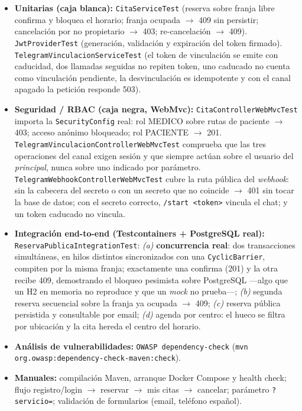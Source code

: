 \documentclass[12pt,a4paper]{report}
\begin{document}
\begin{itemize}
  \item \textbf{Unitarias (caja blanca):} \texttt{CitaServiceTest} (reserva sobre franja libre confirma y bloquea el horario; franja ocupada $\rightarrow$ 409 sin persistir; cancelación por no propietario $\rightarrow$ 403; re-cancelación $\rightarrow$ 409). \texttt{JwtProviderTest} (generación, validación y expiración del token firmado). \texttt{TelegramVinculacionServiceTest} (el token de vinculación se emite con caducidad, dos llamadas seguidas no repiten token, uno caducado no cuenta como vinculación pendiente, la desvinculación es idempotente y con el canal apagado la petición responde 503).
  \item \textbf{Seguridad / RBAC (caja negra, WebMvc):} \texttt{CitaControllerWebMvcTest} importa la \texttt{SecurityConfig} real: rol MEDICO sobre rutas de paciente $\rightarrow$ 403; acceso anónimo bloqueado; rol PACIENTE $\rightarrow$ 201. \texttt{TelegramVinculacionControllerWebMvcTest} comprueba que las tres operaciones del canal exigen sesión y que siempre actúan sobre el usuario del \emph{principal}, nunca sobre uno indicado por parámetro. \texttt{TelegramWebhookControllerWebMvcTest} cubre la ruta pública del \emph{webhook}: sin la cabecera del secreto o con un secreto que no coincide $\rightarrow$ 401 sin tocar la base de datos; con el secreto correcto, \texttt{/start <token>} vincula el chat; y un token caducado no vincula.
  \item \textbf{Integración end-to-end (Testcontainers + PostgreSQL real):} \texttt{ReservaPublicaIntegrationTest}: \emph{(a)} \textbf{concurrencia real}: dos transacciones simultáneas, en hilos distintos sincronizados con una \texttt{CyclicBarrier}, compiten por la misma franja; exactamente una confirma (201) y la otra recibe 409, demostrando el bloqueo pesimista sobre PostgreSQL —algo que un H2 en memoria no reproduce y que un \emph{mock} no prueba—; \emph{(b)} segunda reserva secuencial sobre la franja ya ocupada $\rightarrow$ 409; \emph{(c)} reserva pública persistida y consultable por email; \emph{(d)} agenda por centro: el hueco se filtra por ubicación y la cita hereda el centro del horario.
  \item \textbf{Análisis de vulnerabilidades:} \texttt{OWASP dependency-check} (\texttt{mvn org.owasp:dependency-check-maven:check}).
  \item \textbf{Manuales:} compilación Maven, arranque Docker Compose y health check; flujo registro/login $\rightarrow$ reservar $\rightarrow$ mis citas $\rightarrow$ cancelar; parámetro \texttt{?servicio=}; validación de formularios (email, teléfono español).
\end{itemize}
\end{document}
